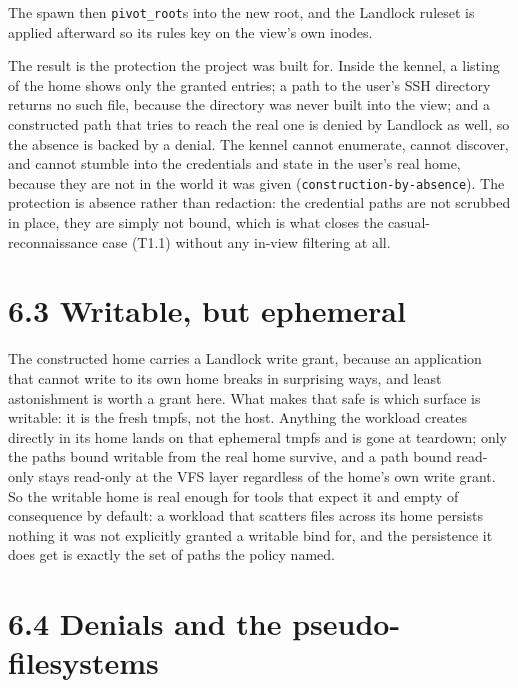 The spawn then \texttt{pivot\_root}s into the new root, and the Landlock
ruleset is applied afterward so its rules key on the view's own inodes.

The result is the protection the project was built for. Inside the
kennel, a listing of the home shows only the granted entries; a path to
the user's SSH directory returns no such file, because the directory was
never built into the view; and a constructed path that tries to reach
the real one is denied by Landlock as well, so the absence is backed by
a denial. The kennel cannot enumerate, cannot discover, and cannot
stumble into the credentials and state in the user's real home, because
they are not in the world it was given
(\texttt{construction-by-absence}). The protection is absence rather
than redaction: the credential paths are not scrubbed in place, they are
simply not bound, which is what closes the casual-reconnaissance case
(T1.1) without any in-view filtering at all.

\hypertarget{writable-but-ephemeral}{%
\section{6.3 Writable, but ephemeral}\label{writable-but-ephemeral}}

The constructed home carries a Landlock write grant, because an
application that cannot write to its own home breaks in surprising ways,
and least astonishment is worth a grant here. What makes that safe is
which surface is writable: it is the fresh tmpfs, not the host. Anything
the workload creates directly in its home lands on that ephemeral tmpfs
and is gone at teardown; only the paths bound writable from the real
home survive, and a path bound read-only stays read-only at the VFS
layer regardless of the home's own write grant. So the writable home is
real enough for tools that expect it and empty of consequence by
default: a workload that scatters files across its home persists nothing
it was not explicitly granted a writable bind for, and the persistence
it does get is exactly the set of paths the policy named.

\hypertarget{denials-and-the-pseudo-filesystems}{%
\section{6.4 Denials and the
pseudo-filesystems}\label{denials-and-the-pseudo-filesystems}}

